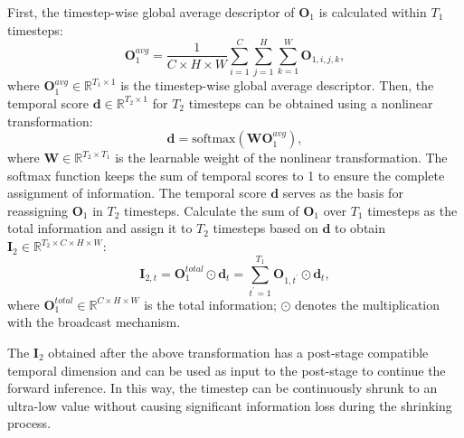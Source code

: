 \documentclass[letterpaper]{article} %
\begin{document}
First, the timestep-wise global average descriptor of $\boldsymbol{O}_1$ is calculated within $T_1$ timesteps:
\begin{equation}
\boldsymbol{O}_1^{avg} = \frac {1}{C \times H \times W} \displaystyle \sum_{i=1}^{C} \sum_{j=1}^{H} \sum_{k=1}^{W}\boldsymbol{O}_{1,i,j,k},
\label{eq8}
\end{equation}
where $\boldsymbol{O}_1^{avg} \in \mathbb{R}^{T_1 \times 1}$ is the timestep-wise global average descriptor. Then, the temporal score $\boldsymbol{d} \in \mathbb{R}^{T_2 \times 1}$ for $T_2$ timesteps can be obtained using a nonlinear transformation:
\begin{equation}
\boldsymbol{d} = \text{softmax} (\boldsymbol{W}\boldsymbol{O}_1^{avg}),
\label{eq9}
\end{equation}
where $\boldsymbol{W} \in \mathbb{R}^{T_2 \times T_1}$ is the learnable weight of the nonlinear transformation. The softmax function keeps the sum of temporal scores to 1 to ensure the complete assignment of information. The temporal score $\boldsymbol{d}$ serves as the basis for reassigning $\boldsymbol{O}_1$ in $T_2$ timesteps. Calculate the sum of $\boldsymbol{O}_1$ over $T_1$ timesteps as the total information and 
assign it to $T_2$ timesteps based on $\boldsymbol{d}$ to obtain $\boldsymbol{I}_2 \in \mathbb{R}^{T_2 \times C \times H \times W}$:
\begin{equation}
\boldsymbol{I}_{2,t} = \boldsymbol{O}_1^{total} \odot \boldsymbol{d}_t  = \sum_{t^{'}=1}^{T_1}\boldsymbol{O}_{1,t^{'}} \odot \boldsymbol{d}_t,
\label{eq10}
\end{equation}
where $\boldsymbol{O}_1^{total} \in \mathbb{R}^{C \times H \times W}$ is the total information; $\odot$ denotes the multiplication with the broadcast mechanism. 

The $\boldsymbol{I}_2$ obtained after the above transformation has a post-stage compatible temporal dimension and can be used as input to the post-stage to continue the forward inference. In this way, the timestep can be continuously shrunk to an ultra-low value without causing significant information loss during the shrinking process.
\end{document}
